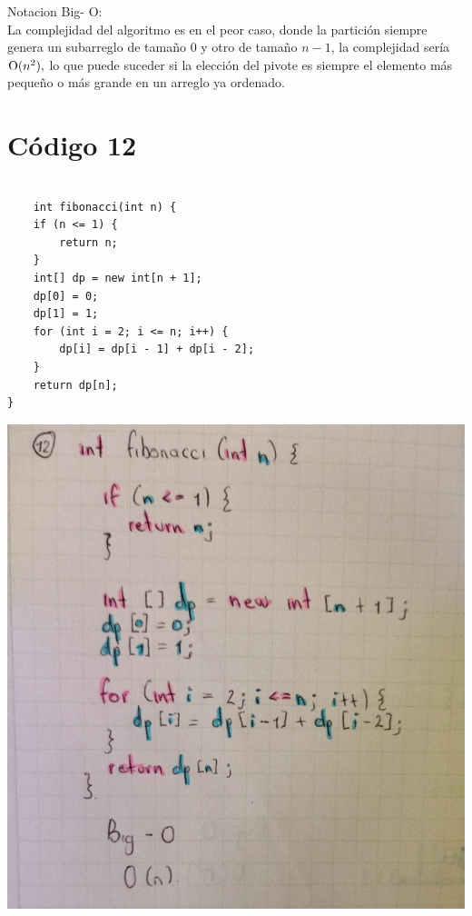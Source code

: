 \documentclass[a4paper,onecolumn,10pt]{article}
\begin{document}
Notacion Big- O:\\
La complejidad del algoritmo es en el peor caso, donde la partición siempre genera un subarreglo de tamaño 0 y otro de tamaño $n-1$, la complejidad sería $\text O(n^2),$ lo que puede suceder si la elección del pivote es siempre el elemento más pequeño o más grande en un arreglo ya ordenado.

\section{Código 12}

\begin{verbatim}
    
    int fibonacci(int n) {
    if (n <= 1) {
        return n;
    }
    int[] dp = new int[n + 1];
    dp[0] = 0;
    dp[1] = 1;
    for (int i = 2; i <= n; i++) {
        dp[i] = dp[i - 1] + dp[i - 2];
    }
    return dp[n];
}

\end{verbatim}

\includegraphics[width=1\linewidth]{imagenes/punto 12.jpeg}
\end{document}
